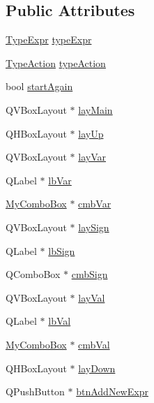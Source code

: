 \subsection*{Public Attributes}
\begin{DoxyCompactItemize}
\item 
\hyperlink{class_expr_editor_a40396ae5bf9765a688e0ea69ab0e64ad}{TypeExpr} \hyperlink{class_expr_editor_a1c7b9320a532938c395d2397a09169f3}{typeExpr}
\item 
\hyperlink{class_expr_editor_a1705d866529cb7d8867be3964d778ae8}{TypeAction} \hyperlink{class_expr_editor_a21311ad2ed99205ae664fcc9e975aae3}{typeAction}
\item 
bool \hyperlink{class_expr_editor_a6315823c9d42e1ae65aebc327724e489}{startAgain}
\item 
QVBoxLayout $\ast$ \hyperlink{class_expr_editor_a217e87862256514b6168f007508a2b9c}{layMain}
\item 
QHBoxLayout $\ast$ \hyperlink{class_expr_editor_a43c9a963c6e9983ee91ed192c5c3543e}{layUp}
\item 
QVBoxLayout $\ast$ \hyperlink{class_expr_editor_aaa0ac9cac3be15113f3197a5be126517}{layVar}
\item 
QLabel $\ast$ \hyperlink{class_expr_editor_aabb83efdb2d69adedc9622a8e165c77c}{lbVar}
\item 
\hyperlink{class_my_combo_box}{MyComboBox} $\ast$ \hyperlink{class_expr_editor_aeba4b8d69aaeffad27becab449f597bd}{cmbVar}
\item 
QVBoxLayout $\ast$ \hyperlink{class_expr_editor_af49fb92e329600de79707e3a8e10935e}{laySign}
\item 
QLabel $\ast$ \hyperlink{class_expr_editor_ac07bdb08a648b9b304d4630e1533227a}{lbSign}
\item 
QComboBox $\ast$ \hyperlink{class_expr_editor_a18bdcf551100de6ea18ca691c84a53c8}{cmbSign}
\item 
QVBoxLayout $\ast$ \hyperlink{class_expr_editor_a1a466cf67dec13e1055f8182c190896d}{layVal}
\item 
QLabel $\ast$ \hyperlink{class_expr_editor_ae9598d6fc354e4550a814cbb4df4cd25}{lbVal}
\item 
\hyperlink{class_my_combo_box}{MyComboBox} $\ast$ \hyperlink{class_expr_editor_a9e1030ee464d33d43444ceaacd4173f0}{cmbVal}
\item 
QHBoxLayout $\ast$ \hyperlink{class_expr_editor_a4839aedd2329ea677bf1fc9d794fb7fb}{layDown}
\item 
QPushButton $\ast$ \hyperlink{class_expr_editor_ad5fabd441b537dd0f7a6d224651e779e}{btnAddNewExpr}

\end{DoxyCompactItemize}
